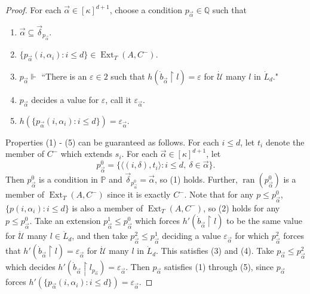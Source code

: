\documentclass{amsart}
\theoremstyle{remark}
\theoremstyle{definition}
\theoremstyle{remark}
\newcommand{\al}{\alpha}
\newcommand{\sse}{\subseteq}
\newcommand{\forces}{\Vdash}
\DeclareMathOperator{\ran}{ran}
\DeclareMathOperator{\Ext}{Ext}
\newcommand{\re}{\restriction}
\newcommand{\bP}{\mathbb{P}}
\newcommand{\bQ}{\mathbb{Q}}
\newcommand{\lgl}{\langle}
\newcommand{\rgl}{\rangle}
\begin{document}
\begin{proof}
For each $\vec\al\in[\kappa]^{d+1}$,
choose a condition $p_{\vec{\al}}\in\bQ$ such that
\begin{enumerate}
\item
 $\vec{\al}\sse\vec{\delta}_{p_{\vec\al}}$.

\item
$\{p_{\vec\al}(i,\al_i):i\le  d\}\in\Ext_T(A,C^-)$.
\item
$p_{\vec{\al}}\forces$ ``There is an $\varepsilon\in 2$  such that
$h(\dot{b}_{\vec{\al}}\re l)=\varepsilon$
for $\dot{\mathcal{U}}$ many $l$ in $\dot{L}_d$."


\item
$p_{\vec{\al}}$ decides a value for $\varepsilon$, call it  $\varepsilon_{\vec{\al}}$.
\item
$h(\{p_{\vec\al}(i,\al_i):i\le  d\})=\varepsilon_{\vec{\al}}$.
\end{enumerate}





Properties (1) -  (5) can be guaranteed  as follows.
For each $i\le d$, let $t_i$ denote the member of $C^-$ which extends $s_i$.
For each  $\vec{\al}\in[\kappa]^{d+1}$, let
$$
p^0_{\vec{\al}}=\{\lgl (i,\delta), t_i\rgl: i\le d, \ \delta\in\vec{\al} \}.
$$
Then $p^0_{\vec{\al}}$ is a condition in $\bP$ and
$\vec\delta_{p_{\vec\al}^0}= \vec\al$, so (1) holds.
Further,
$\ran(p^0_{\vec\al})$ is a member of $\Ext_T(A,C^-)$ since it is exactly $C^-$.
Note that
for any $p\le p_{\vec\al}^0$,
 $\{p(i,\al_i):i\le d\}$
is also  a member of $\Ext_T(A,C^-)$,
so (2) holds for any $p\le p_{\vec\al}^0$.
Take  an extension $p^1_{\vec{\al}}\le p^0_{\vec{\al}}$ which
forces  $h'(\dot{b}_{\vec{\al}}\re l)$ to be the same value for
$\dot{\mathcal{U}}$  many  $l\in \dot{L}_d$,
and then take
 $p^2_{\vec{\al}}\le p_{\vec{\al}}^1$ deciding a value $\varepsilon_{\vec{\al}}$ for which $p^2_{\vec{\al}}$ forces that $h'(\dot{b}_{\vec{\al}}\re l)=\varepsilon_{\vec{\al}}$
for $\dot{\mathcal{U}}$ many $l$ in $\dot{L}_d$.
This satisfies
 (3) and (4).
Take $p_{\vec\al}\le p^2_{\vec\al}$  which  decides  $h'(\dot{b}_{\vec\al}\re l_{p_{\vec\al}})=\varepsilon_{\vec\al}$.
Then $p_{\vec\al}$ satisfies (1) through (5),
since
$p_{\vec\al}$ forces
 $h'(\{p_{\vec\al}(i,\al_i):i\le d\})=\varepsilon_{\vec\al}$.





\end{proof}
\end{document}
